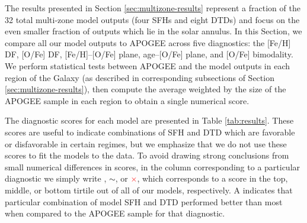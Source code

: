\documentclass[twocolumn,twocolappendix,linenumbers,trackchanges]{aastex631}
\newcommand{\yes}{\textcolor{green}{\checkmark}\xspace}
\newcommand{\meh}{\textcolor{black}{$\sim$}\xspace}
\newcommand{\no}{\textcolor{red}{$\times$}\xspace}
\begin{document}
The results presented in Section \ref{sec:multizone-results} represent a fraction of the 32 total multi-zone model outputs (four SFHs and eight DTDs) and focus on the even smaller fraction of outputs which lie in the solar annulus. 
In this Section, we compare all our model outputs to APOGEE across five diagnostics: the [Fe/H] DF, [O/Fe] DF, [Fe/H]--[O/Fe] plane, age--[O/Fe] plane, and [O/Fe] bimodality. We perform statistical tests between APOGEE and the model outputs in each region of the Galaxy (as described in corresponding subsections of Section \ref{sec:multizone-results}), then compute the average weighted by the size of the APOGEE sample in each region to obtain a single numerical score.

The diagnostic scores for each model are presented in Table \ref{tab:results}. These scores are useful to indicate combinations of SFH and DTD which are favorable or disfavorable in certain regimes, but we emphasize that we do not use these scores to fit the models to the data.
To avoid drawing strong conclusions from small numerical differences in scores, 
in the column corresponding to a particular diagnostic we simply write \yes, \meh, or \no, which corresponds to a score in the top, middle, or bottom tirtile out of all of our models, respectively. A \yes indicates that particular combination of model SFH and DTD performed better than most when compared to the APOGEE sample for that diagnostic.
\end{document}

